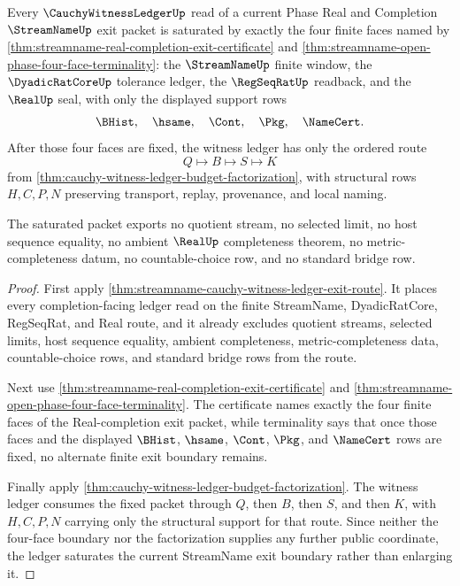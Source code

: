 \begin{theorem}
\label{thm:streamname-cauchy-witness-ledger-exit-saturation}
Every $\CauchyWitnessLedgerUp$ read of a current Phase Real and Completion $\StreamNameUp$ exit packet is saturated by exactly the four finite faces named by \autoref{thm:streamname-real-completion-exit-certificate} and \autoref{thm:streamname-open-phase-four-face-terminality}: the $\StreamNameUp$ finite window, the $\DyadicRatCoreUp$ tolerance ledger, the $\RegSeqRatUp$ readback, and the $\RealUp$ seal, with only the displayed support rows
$$
\BHist,\quad \hsame,\quad \Cont,\quad \Pkg,\quad \NameCert.
$$
After those four faces are fixed, the witness ledger has only the ordered route
$$
Q \longmapsto B \longmapsto S \longmapsto K
$$
from \autoref{thm:cauchy-witness-ledger-budget-factorization}, with structural rows $H,C,P,N$ preserving transport, replay, provenance, and local naming.

The saturated packet exports no quotient stream, no selected limit, no host sequence equality, no ambient $\RealUp$ completeness theorem, no metric-completeness datum, no countable-choice row, and no standard bridge row.
\end{theorem}
\begin{proof}
First apply \autoref{thm:streamname-cauchy-witness-ledger-exit-route}. It places every completion-facing ledger read on the finite StreamName, DyadicRatCore, RegSeqRat, and Real route, and it already excludes quotient streams, selected limits, host sequence equality, ambient completeness, metric-completeness data, countable-choice rows, and standard bridge rows from the route.

Next use \autoref{thm:streamname-real-completion-exit-certificate} and \autoref{thm:streamname-open-phase-four-face-terminality}. The certificate names exactly the four finite faces of the Real-completion exit packet, while terminality says that once those faces and the displayed $\BHist$, $\hsame$, $\Cont$, $\Pkg$, and $\NameCert$ rows are fixed, no alternate finite exit boundary remains.

Finally apply \autoref{thm:cauchy-witness-ledger-budget-factorization}. The witness ledger consumes the fixed packet through $Q$, then $B$, then $S$, and then $K$, with $H,C,P,N$ carrying only the structural support for that route. Since neither the four-face boundary nor the factorization supplies any further public coordinate, the ledger saturates the current StreamName exit boundary rather than enlarging it.
\end{proof}

